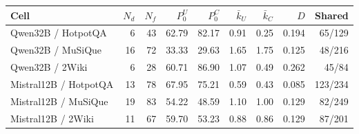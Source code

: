 \begin{tabular}{@{}lrrrrrrrr@{}}
\toprule
Cell & $N_d$ & $N_f$ & $P_0^U$ & $P_0^C$ & $\bar{k}_U$ & $\bar{k}_C$ & $D$ & Shared \\
\midrule
Qwen32B / HotpotQA & 6 & 43 & 62.79 & 82.17 & 0.91 & 0.25 & 0.194 & 65/129 \\
Qwen32B / MuSiQue & 16 & 72 & 33.33 & 29.63 & 1.65 & 1.75 & 0.125 & 48/216 \\
Qwen32B / 2Wiki & 6 & 28 & 60.71 & 86.90 & 1.07 & 0.49 & 0.262 & 45/84 \\
Mistral12B / HotpotQA & 13 & 78 & 67.95 & 75.21 & 0.59 & 0.43 & 0.085 & 123/234 \\
Mistral12B / MuSiQue & 19 & 83 & 54.22 & 48.59 & 1.10 & 1.00 & 0.129 & 82/249 \\
Mistral12B / 2Wiki & 11 & 67 & 59.70 & 53.23 & 0.88 & 0.86 & 0.129 & 87/201 \\
\bottomrule
\end{tabular}
